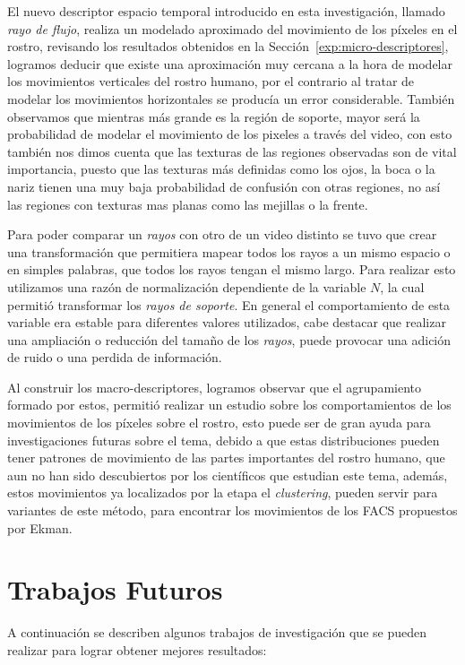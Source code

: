 El nuevo descriptor espacio temporal introducido en esta investigación, llamado \textit{rayo de flujo}, realiza un modelado aproximado del movimiento de los píxeles en el rostro, revisando los resultados obtenidos en la Sección~\ref{exp:micro-descriptores}, logramos deducir que existe una aproximación muy cercana a la hora de modelar los movimientos verticales del rostro humano, por el contrario al tratar de modelar los movimientos horizontales se producía un error considerable. También observamos que mientras más grande es la región de soporte, mayor será la probabilidad de modelar el movimiento de los pixeles a través del video, con esto también nos dimos cuenta que las texturas de las regiones observadas son de vital importancia, puesto que las texturas más definidas como los ojos, la boca o la nariz tienen una muy baja probabilidad de confusión con otras regiones, no así las regiones con texturas mas planas como las mejillas o la frente.

Para poder comparar un \textit{rayos} con otro de un video distinto se tuvo que crear una transformación que permitiera mapear todos los rayos a un mismo espacio o en simples palabras, que todos los rayos tengan el mismo largo. Para realizar esto utilizamos una razón de normalización dependiente de la variable $N$, la cual permitió transformar los \textit{rayos de soporte}. En general el comportamiento de esta variable era estable para diferentes valores utilizados, cabe destacar que realizar una ampliación o reducción del tamaño de los \textit{rayos}, puede provocar una adición de ruido o  una perdida de información. 

Al construir los macro-descriptores, logramos observar que el agrupamiento formado por estos, permitió realizar un estudio sobre los comportamientos de los movimientos de los píxeles sobre el rostro, esto puede ser de gran ayuda para investigaciones futuras sobre el tema, debido a que estas distribuciones pueden tener patrones de movimiento de las partes importantes del rostro humano, que aun no han sido descubiertos por los científicos que estudian este tema, además, estos movimientos ya localizados por la etapa el \textit{clustering}, pueden servir para variantes de este método, para encontrar los movimientos de los FACS propuestos por Ekman.

\section{Trabajos Futuros}

A continuación se describen algunos trabajos de investigación que se pueden realizar para lograr obtener mejores resultados:

